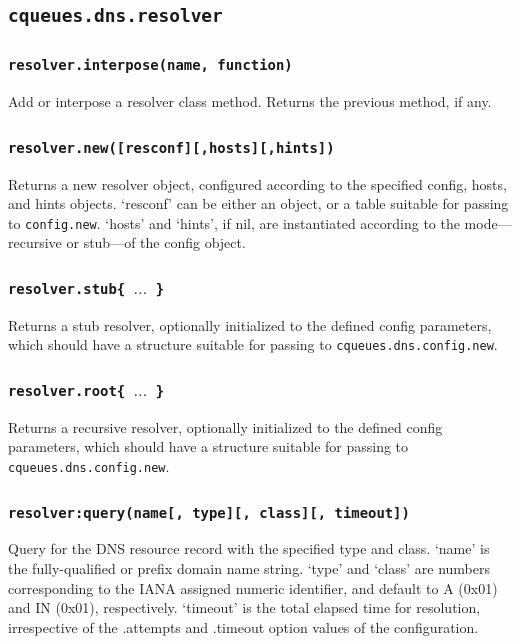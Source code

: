\documentclass[11pt, oneside]{memoir}
\newcommand*{\fn}[1]{\texttt{#1}\xspace}
\newcounter{toccols}
\newenvironment{Module}[1]{
	\subsection{\texttt{#1}}
	\addtocontents{toc}{
		\protect\begin{multicols}{\value{toccols}}
	}
}{
	\addtocontents{toc}{\protect\end{multicols}}
}
\begin{document}
\begin{Module}{cqueues.dns.resolver}

\subsubsection[\fn{resolver.interpose}]{\fn{resolver.interpose(name, function)}}

Add or interpose a resolver class method. Returns the previous method, if any.

\subsubsection[\fn{resolver.new}]{\fn{resolver.new([resconf][,hosts][,hints])}}

Returns a new resolver object, configured according to the specified config, hosts, and hints objects. `resconf' can be either an object, or a table suitable for passing to \fn{config.new}. `hosts' and `hints', if nil, are instantiated according to the mode---recursive or stub---of the config object.

\subsubsection[\fn{resolver.stub}]{\fn{resolver.stub\{ $\ldots$ \}}}

Returns a stub resolver, optionally initialized to the defined config parameters, which should have a structure suitable for passing to \fn{cqueues.dns.config.new}.

\subsubsection[\fn{resolver.root}]{\fn{resolver.root\{ $\ldots$ \}}}

Returns a recursive resolver, optionally initialized to the defined config parameters, which should have a structure suitable for passing to \fn{cqueues.dns.config.new}.

\subsubsection[\fn{resolver:query}]{\fn{resolver:query(name[, type][, class][, timeout])}}

Query for the DNS resource record with the specified type and class. `name' is the fully-qualified or prefix domain name string. `type' and `class' are numbers corresponding to the IANA assigned numeric identifier, and default to A (0x01) and IN (0x01), respectively. `timeout' is the total elapsed time for resolution, irrespective of the .attempts and .timeout option values of the  configuration.


\end{Module}
\end{document}
